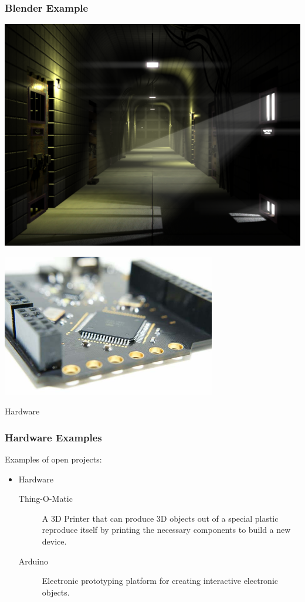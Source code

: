 \documentclass{beamer}
\begin{document}
\begin{frame}
  \frametitle{Blender Example}
    \includegraphics[width=\textwidth]{../img/blendermine}
\end{frame}

\begin{frame}
  \begin{center} 
    \includegraphics[width=0.7\textwidth]{../img/hardware}
    \begin{Huge} Hardware \end{Huge} 
  \end{center}
\end{frame}

\begin{frame}
  \frametitle{Hardware Examples}
  Examples of open projects:

  \begin{itemize}
  \item Hardware
    \begin{description}
    \item[Thing-O-Matic] A \textcolor{beamer@myblue}{3D} Printer that
      can produce 3D objects out of a special plastic
      \textcolor{beamer@myblue}{reproduce} itself by printing the
      necessary components to build a new device.
    \item[Arduino] Electronic prototyping platform for creating
      interactive electronic objects.
    \end{description}
  \end{itemize}
\end{frame}
\end{document}
